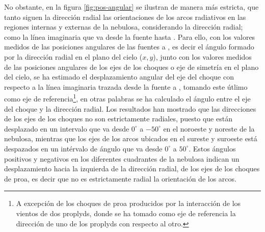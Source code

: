 No obstante, en la figura \ref{fig:pos-angular} se ilustran de manera más estricta, que tanto siguen la dirección radial las orientaciones de los arcos radiativos en las regiones internas y externas  de la nebulosa, considerando la dirección radial; como la línea imaginaria que va desde la fuente hasta \thC{}. Para ello, con los valores medidos de las posiciones angulares de las fuentes a \thC{}, es decir el ángulo formado por la dirección radial en el plano del cielo (\(x, y\)), junto con los valores medidos de las posiciones angulares de los ejes de los choques o eje de simetría en el plano del cielo, se ha estimado el desplazamiento angular del eje del choque con respecto a la línea imaginaria trazada desde la fuente a \thC{}, tomando este útlimo como eje de referencia\footnote{A excepción de los choques de proa producidos por  la interacción de los vientos de dos proplyds, donde se ha tomado como eje de referencia la dirección de uno de los proplyds con respecto al otro.}, en otras palabras se ha calculado el ángulo entre el eje del choque y la dirección radial. Los resultados han mostrado que las direcciones de los ejes de los choques no son estrictamente radiales, puesto que están desplazado en un intervalo  que va desde \(0^{\circ}\) a \(-50^{\circ}\) en el noroeste y noreste de la nebulosa, mientras que los ejes de los arcos ubicados en el sureste y suroeste está despazados en un intérvalo de ángulo que va desde \(0^{\circ}\) a \(50^{\circ}\). Estos ángulos positivos y negativos en los diferentes cuadrantes de la nebulosa indican un desplazamiento hacia la izquierda de la dirección radial, de los ejes de los choques de proa, es decir que no es estrictamente radial la orientación de los arcos. \\


